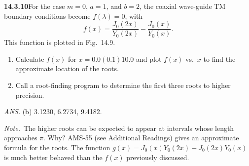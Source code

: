 \par\bigskip
\noindent\textbf{14.3.10}\quad For the case $m=0$, $a=1$, and $b=2$,
the coaxial wave-guide TM boundary conditions become $f(\lambda)=0$,
with
\[
f(x)=\frac{J_{0}(2x)}{Y_{0}(2x)}-\frac{J_{0}(x)}{Y_{0}(x)}.
\]
This function is plotted in Fig.~14.9.
\begin{enumerate}
\item[(a)] Calculate $f(x)$ for $x=0.0(0.1)10.0$ and plot $f(x)$
vs.\ $x$ to find the approximate location of the roots.
\item[(b)] Call a root-finding program to determine the first three
roots to higher precision.
\end{enumerate}
\par\nobreak\hfill\emph{ANS.}\enspace
(b) 3.1230, 6.2734, 9.4182.
\par\emph{Note.}~The higher roots can be expected to appear at intervals
whose length approaches $\pi$. Why? AMS-55 (see Additional Readings)
gives an approximate formula for the roots. The function
$g(x)=J_{0}(x)Y_{0}(2x)-J_{0}(2x)Y_{0}(x)$ is much better behaved than
the $f(x)$ previously discussed.
\par{}
\solution
{}

